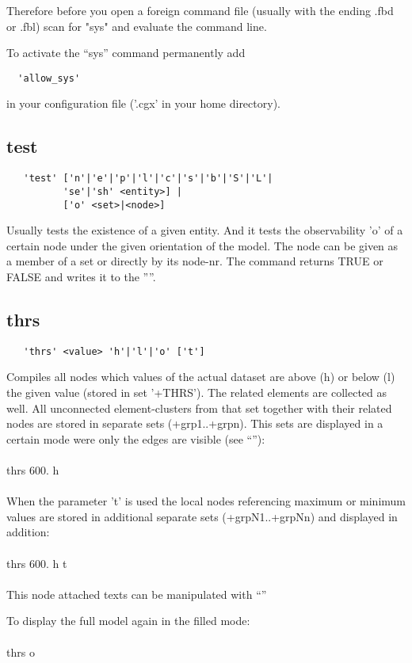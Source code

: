 \documentclass{article}
\begin{document}
Therefore before you open a foreign command file (usually with the ending .fbd or .fbl) scan for "sys" and evaluate the command line.

To activate the ``sys'' command permanently add
\begin{verbatim}
  'allow_sys'
\end{verbatim}
in your configuration file ('.cgx' in your home directory).
 
\subsection{\label{test}test}
\begin{verbatim}
   'test' ['n'|'e'|'p'|'l'|'c'|'s'|'b'|'S'|'L'|
          'se'|'sh' <entity>] |
          ['o' <set>|<node>]
\end{verbatim}
Usually tests the existence of a given entity. And it tests the observability 'o' of a certain node under the given orientation of the model. The node can be given as a member of a set or directly by its node-nr. The command returns TRUE or FALSE and writes it to the ''''.

\subsection{\label{thrs}thrs}
\begin{verbatim}
   'thrs' <value> 'h'|'l'|'o' ['t']
\end{verbatim}
Compiles all nodes which values of the actual dataset are above (h) or below (l) the given value (stored in set '+THRS'). The related elements are collected as well. All unconnected element-clusters from that set together with their related nodes are stored in separate sets (+grp1..+grpn). This sets are displayed in a certain mode were only the edges are visible (see ``''):\\\\thrs 600. h\\\\
When the parameter 't' is used the local nodes referencing maximum or minimum values are stored in additional separate sets (+grpN1..+grpNn) and displayed in addition:\\\\thrs 600. h t\\\\This node attached texts can be manipulated with ``''

To display the full model again in the filled mode:\\\\thrs o\\\\
\end{document}
